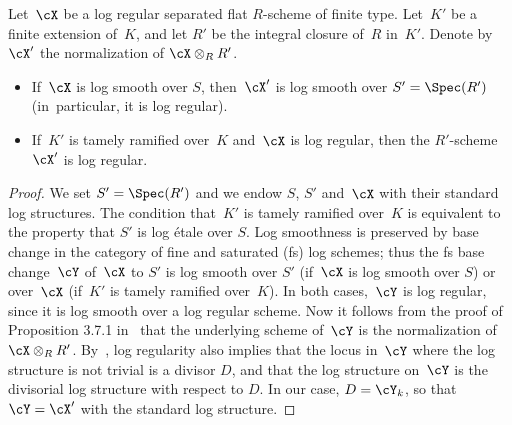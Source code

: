 \begin{prop}\label{prop:logreg}
Let~$\cX$ be a log regular separated flat $R$\nobreakdash-scheme of finite type.
Let~$K'$ be a finite extension of~$K$, and let $R'$ be the integral closure of~$R$ in~$K'$. Denote by~$\cX'$ the normalization of $\cX\otimes_R R'$.
\begin{itemize}
\item[(i)]
If~$\cX$ is log smooth over $S$, then~$\cX'$ is log smooth over $S'=\Spec(R')$ (in~particular, it is log regular).
\item[(ii)]
If~$K'$ is tamely ramified over~$K$ and~$\cX$ is log regular, then the $R'$-scheme~$\cX'$ is log regular.
\end{itemize}
\end{prop}
\begin{proof}
We set $S'=\Spec(R')$ and we endow $S$, $S'$ and~$\cX$ with their standard log structures. The condition that~$K'$ is tamely ramified over~$K$ is equivalent to the property that $S'$ is log étale over $S$.
Log smoothness is preserved by base change in the category of fine and saturated (fs) log schemes; thus the fs base change~$\cY$ of~$\cX$ to $S'$ is log smooth over $S'$ (if~$\cX$ is log smooth over $S$) or over~$\cX$ (if~$K'$ is tamely ramified over~$K$). In both cases,~$\cY$ is log regular, since it is log smooth over a log regular scheme.
Now it follows from the proof of Proposition 3.7.1 in~\cite{logzeta} that the underlying scheme of~$\cY$ is the normalization of $\cX\otimes_R R'$.
By~\cite[11.6]{kato}, log regularity also implies that the locus in~$\cY$ where the log structure is not trivial is a divisor $D$, and that the log structure on~$\cY$ is the divisorial log structure with respect to $D$. In our case, $D=\cY_k$, so that $\cY=\cX'$ with the standard log structure.
\end{proof}

